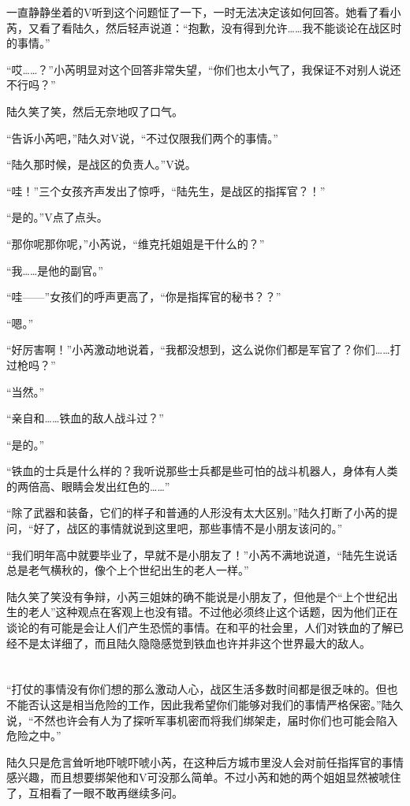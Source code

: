一直静静坐着的V听到这个问题怔了一下，一时无法决定该如何回答。她看了看小芮，又看了看陆久，然后轻声说道：“抱歉，没有得到允许……我不能谈论在战区时的事情。”

“哎……？”小芮明显对这个回答非常失望，“你们也太小气了，我保证不对别人说还不行吗？”

陆久笑了笑，然后无奈地叹了口气。

“告诉小芮吧，”陆久对V说，“不过仅限我们两个的事情。”

“陆久那时候，是战区的负责人。”V说。

“哇！”三个女孩齐声发出了惊呼，“陆先生，是战区的指挥官？！”

“是的。”V点了点头。

“那你呢那你呢，”小芮说，“维克托姐姐是干什么的？”

“我……是他的副官。”

“哇——”女孩们的呼声更高了，“你是指挥官的秘书？？”

“嗯。”

“好厉害啊！”小芮激动地说着，“我都没想到，这么说你们都是军官了？你们……打过枪吗？”

“当然。”

“亲自和……铁血的敌人战斗过？”

“是的。”

“铁血的士兵是什么样的？我听说那些士兵都是些可怕的战斗机器人，身体有人类的两倍高、眼睛会发出红色的……”

“除了武器和装备，它们的样子和普通的人形没有太大区别。”陆久打断了小芮的提问，“好了，战区的事情就说到这里吧，那些事情不是小朋友该问的。”

“我们明年高中就要毕业了，早就不是小朋友了！”小芮不满地说道，“陆先生说话总是老气横秋的，像个上个世纪出生的老人一样。”

陆久笑了笑没有争辩，小芮三姐妹的确不能说是小朋友了，但他是个“上个世纪出生的老人”这种观点在客观上也没有错。不过他必须终止这个话题，因为他们正在谈论的有可能是会让人们产生恐慌的事情。在和平的社会里，人们对铁血的了解已经不是太详细了，而且陆久隐隐感觉到铁血也许并非这个世界最大的敌人。

\section*{}

“打仗的事情没有你们想的那么激动人心，战区生活多数时间都是很乏味的。但也不能否认这是相当危险的工作，因此我希望你们能够对我们的事情严格保密。”陆久说，“不然也许会有人为了探听军事机密而将我们绑架走，届时你们也可能会陷入危险之中。”

陆久只是危言耸听地吓唬吓唬小芮，在这种后方城市里没人会对前任指挥官的事情感兴趣，而且想要绑架他和V可没那么简单。不过小芮和她的两个姐姐显然被唬住了，互相看了一眼不敢再继续多问。

